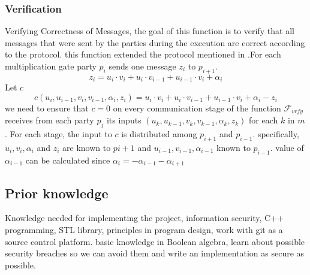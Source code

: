 \documentclass[12pt]{article}
\begin{document}
\subsubsection{Verification}
Verifying Correctness of Messages, the goal of this function is to verify that all messages that were sent by the parties during the execution are correct according to the protocol. this function extended the protocol mentioned in \cite{main_based}.\hfill\break For each multiplication gate party $p_i$ sends one message $z_i$ to $p_{i+1}$.
\begin{equation} \label{eq:1}
z_i = u_i \cdot v_i + u_i \cdot v_{i-1} + u_{i-1} \cdot v_i + \alpha_i
\end{equation}
Let $c$ 
\begin{equation} \label{eq:2}
c(u_i, u_{i-1}, v_i, v_{i-1}, \alpha_i, z_i) = u_i \cdot v_i + u_i \cdot v_{i-1} + u_{i-1} \cdot v_i + \alpha_i - z_i
\end{equation}
we need to ensure that $c = 0$ on every communication stage of the function 
$\mathcal{F}_{vrfy}$ receives from each party $p_j$ its inputs $(u_k, u_{k-1},v_k,v_{k-1},\alpha_k,z_k)$ for each $k$ in $m$.
For each stage, the input to $c$ is distributed among $p_{i+1}$ and $p_{i-1}$.  specifically, $u_i,v_i,\alpha_i$ and $z_i$ are known to $p{i+1}$ and $u_{i-1},v_{i-1}, \alpha_{i-1} $ known to $p_{i-1}$. value of $\alpha_{i-1}$ can be calculated since $\alpha_i = -\alpha_{i-1} - \alpha_{i+1}$ 


\subsection{Prior knowledge}
Knowledge needed for implementing the project, information security, C++ programming, STL library, principles in program design, work with git as a source control platform. basic knowledge in Boolean algebra, learn about possible security breaches so we can avoid them and write an implementation as secure as possible. 
\end{document}
